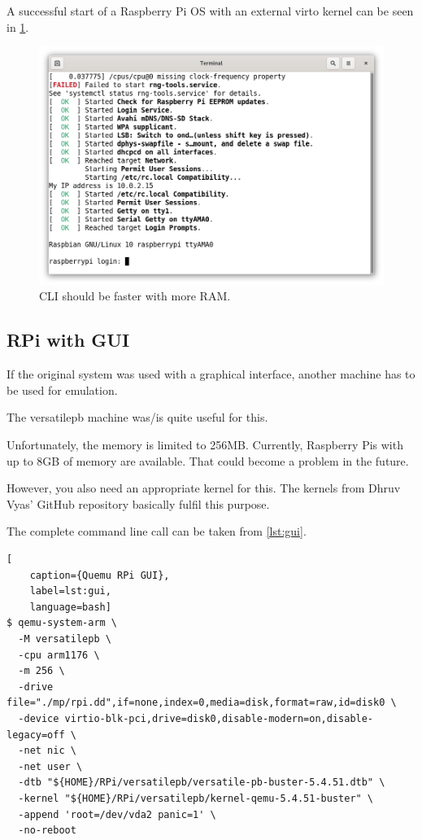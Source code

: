 \noindent A successful start of a Raspberry Pi OS with an external virto kernel can be seen in \cref{fig:cli}.

\begin{figure}[htbp]  %
  \centering
  \includegraphics[width=.5\textwidth]{figures/boot-rpi-with-cli-only.png}
  \caption[Qemu RPi CLI]{CLI should be faster with more RAM.}
  \label{fig:cli}
\end{figure}

\subsection{RPi with GUI}

If the original system was used with a graphical interface, another machine has to be used for emulation.

The \glqq{}versatilepb\grqq{} machine was/is quite useful for this.

Unfortunately, the memory is limited to 256MB. Currently, Raspberry Pis with up to 8GB of memory are available. That could become a problem in the future.

However, you also need an appropriate kernel for this. The kernels from Dhruv Vyas' GitHub repository \cite{Versatilepb} basically fulfil this purpose.

The complete command line call can be taken from \cref{lst:gui}.

\begin{lstlisting}[
    caption={Quemu RPi GUI},
    label=lst:gui,
    language=bash]
$ qemu-system-arm \
  -M versatilepb \
  -cpu arm1176 \
  -m 256 \
  -drive file="./mp/rpi.dd",if=none,index=0,media=disk,format=raw,id=disk0 \
  -device virtio-blk-pci,drive=disk0,disable-modern=on,disable-legacy=off \
  -net nic \
  -net user \
  -dtb "${HOME}/RPi/versatilepb/versatile-pb-buster-5.4.51.dtb" \
  -kernel "${HOME}/RPi/versatilepb/kernel-qemu-5.4.51-buster" \
  -append 'root=/dev/vda2 panic=1' \
  -no-reboot
\end{lstlisting}

